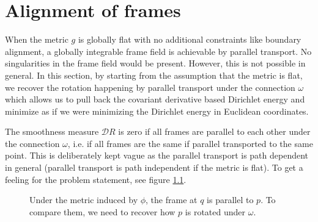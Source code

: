 \documentclass[../thesis.tex]{subfiles}
\begin{document}
\newcommand{\str}[1]{\textsc{#1}}
\newcommand{\var}[1]{\textit{#1}}
\def \ifempty#1{\def\temp{#1} \ifx\temp\empty }
\newcommand{\msg}[2]{\ensuremath{\ifempty{#2} [\str{#1}] \else [\str{#1}, {#2}] \fi}}
\newcommand{\tup}[1]{\ensuremath{\langle #1 \rangle}}
\newcommand{\nil}{\ensuremath{\bot}}
\newcommand{\false}{\textsc{false}\xspace}
\newcommand{\true}{\textsc{true}\xspace}

\newcommand\lastts{\var{lastts}\xspace}
\newcommand\nextts{\var{nextts}\xspace}
\newcommand\trusted{\var{trusted}\xspace}
\newcommand\newepoch{\var{newepoch}\xspace}
\newcommand\leader{\var{leader}\xspace}
\newcommand\ts{\var{ts}\xspace}
\newcommand{\CK}{\ensuremath{\mathcal{K}}\xspace}
\newcommand{\CP}{\ensuremath{\mathcal{P}}\xspace}
\newcommand{\CQ}{\ensuremath{\mathcal{Q}}\xspace}


\chapter{Alignment of frames}
\label{ch:calculation}
When the metric $g$ is globally flat with no additional constraints like
boundary alignment, a globally integrable frame field is achievable
by parallel transport. No singularities in the frame field would be present.
However, this is not possible in general.
In this section, by starting from the assumption that the metric
is flat, we recover the rotation happening by parallel transport under
the connection $\omega$ which allows us
to pull back the covariant derivative based Dirichlet energy
and minimize as if we were minimizing
the Dirichlet energy in Euclidean coordinates.

The smoothness measure $\mathcal{D}R$ is zero if all frames are parallel
to each other under the connection $\omega$, i.e. if all frames
are the same if parallel transported to the same point.
This is deliberately kept vague as the parallel transport is path
dependent in general (parallel transport is path independent if the metric is flat).
To get a feeling for the problem statement, see figure \ref{fig:rotation}.

\begin{figure}[htb]
  \centering
  \def\svgwidth{20em}
  
  \caption{Under the metric induced by $\phi$, the frame at $q$ is parallel to $p$.
  To compare them, we need to recover how $p$ is rotated under $\omega$.}
  \label{fig:rotation}
\end{figure}
\end{document}
